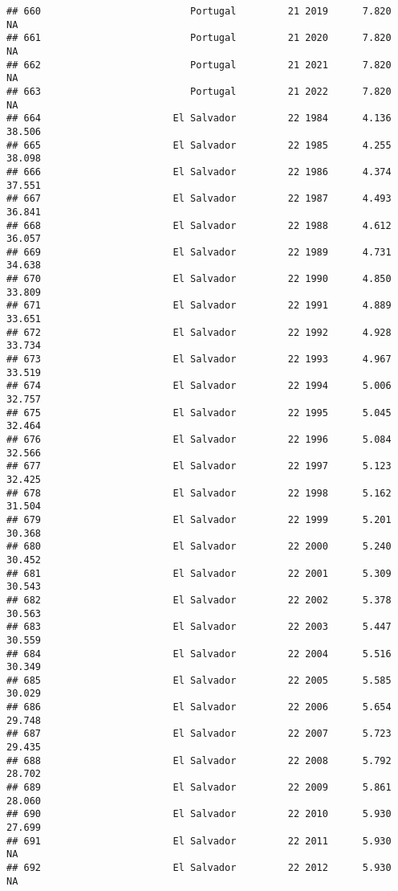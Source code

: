 \documentclass[
]{article}
\begin{document}
\begin{verbatim}
## 660                          Portugal         21 2019      7.820         NA
## 661                          Portugal         21 2020      7.820         NA
## 662                          Portugal         21 2021      7.820         NA
## 663                          Portugal         21 2022      7.820         NA
## 664                       El Salvador         22 1984      4.136     38.506
## 665                       El Salvador         22 1985      4.255     38.098
## 666                       El Salvador         22 1986      4.374     37.551
## 667                       El Salvador         22 1987      4.493     36.841
## 668                       El Salvador         22 1988      4.612     36.057
## 669                       El Salvador         22 1989      4.731     34.638
## 670                       El Salvador         22 1990      4.850     33.809
## 671                       El Salvador         22 1991      4.889     33.651
## 672                       El Salvador         22 1992      4.928     33.734
## 673                       El Salvador         22 1993      4.967     33.519
## 674                       El Salvador         22 1994      5.006     32.757
## 675                       El Salvador         22 1995      5.045     32.464
## 676                       El Salvador         22 1996      5.084     32.566
## 677                       El Salvador         22 1997      5.123     32.425
## 678                       El Salvador         22 1998      5.162     31.504
## 679                       El Salvador         22 1999      5.201     30.368
## 680                       El Salvador         22 2000      5.240     30.452
## 681                       El Salvador         22 2001      5.309     30.543
## 682                       El Salvador         22 2002      5.378     30.563
## 683                       El Salvador         22 2003      5.447     30.559
## 684                       El Salvador         22 2004      5.516     30.349
## 685                       El Salvador         22 2005      5.585     30.029
## 686                       El Salvador         22 2006      5.654     29.748
## 687                       El Salvador         22 2007      5.723     29.435
## 688                       El Salvador         22 2008      5.792     28.702
## 689                       El Salvador         22 2009      5.861     28.060
## 690                       El Salvador         22 2010      5.930     27.699
## 691                       El Salvador         22 2011      5.930         NA
## 692                       El Salvador         22 2012      5.930         NA

\end{verbatim}
\end{document}
